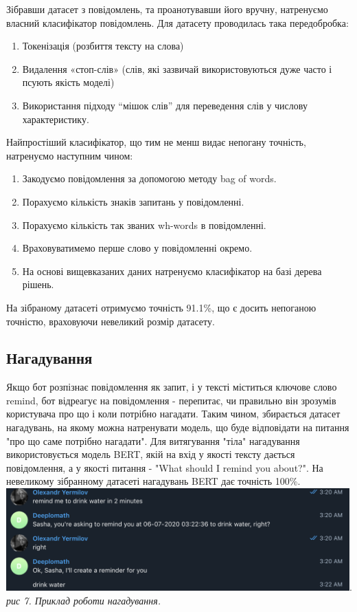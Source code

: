 Зібравши датасет з повідомлень, та проанотувавши його вручну, натренуємо власний класифікатор повідомлень. Для датасету проводилась така передобробка:

\begin{enumerate}
\item Токенізація (розбиття тексту на слова)
\item Видалення «стоп-слів» (слів, які зазвичай використовуються дуже часто і псують якість моделі)
\item Використання підходу “мішок слів” для переведення слів у числову характеристику.
\end{enumerate}
Найпростіший класифікатор, що тим не менш видає непогану точність, натренуємо наступним чином:

\begin{enumerate}
\item Закодуємо повідомлення за допомогою методу bag of words.
\item Порахуємо кількість знаків запитань у повідомленні.
\item Порахуємо кількість так званих wh-words в повідомленні.
\item Враховуватимемо перше слово у повідомленні окремо.
\item На основі вищевказаних даних натренуємо класифікатор на базі дерева рішень.
\end{enumerate}
На зібраному датасеті отримуємо точність 91.1\%, що є досить непоганою точністю, враховуючи невеликий розмір датасету.

\subsection{Нагадування}
Якщо бот розпізнає повідомлення як запит,  і у тексті міститься ключове слово remind, бот відреагує на повідомлення - перепитає, чи правильно він зрозумів користувача про що і коли потрібно нагадати. Таким чином, збирається датасет нагадувань, на якому можна натренувати модель, що буде відповідати на питання "про що саме потрібно нагадати". Для витягування "тіла" нагадування використовується модель BERT, якій на вхід у якості тексту дається повідомлення, а у якості питання - "What should I remind you about?". На невеликому зібранному датасеті нагадувань BERT дає точність 100\%.\\
\includegraphics[width=500]{Dissertation/reminder_working.png}.\\
\textit{рис 7. Приклад роботи нагадування.}


